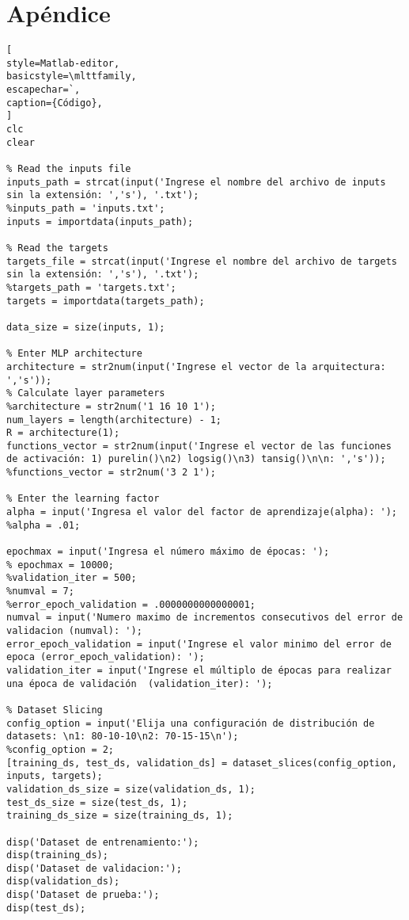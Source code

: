 \documentclass{article}
\begin{document}
\section{Apéndice}
\begin{lstlisting}[
style=Matlab-editor,
basicstyle=\mlttfamily,
escapechar=`,
caption={Código},
]
clc
clear

% Read the inputs file
inputs_path = strcat(input('Ingrese el nombre del archivo de inputs sin la extensión: ','s'), '.txt');
%inputs_path = 'inputs.txt';
inputs = importdata(inputs_path);

% Read the targets
targets_file = strcat(input('Ingrese el nombre del archivo de targets sin la extensión: ','s'), '.txt');
%targets_path = 'targets.txt';
targets = importdata(targets_path);

data_size = size(inputs, 1);

% Enter MLP architecture
architecture = str2num(input('Ingrese el vector de la arquitectura: ','s'));
% Calculate layer parameters
%architecture = str2num('1 16 10 1');
num_layers = length(architecture) - 1;
R = architecture(1);
functions_vector = str2num(input('Ingrese el vector de las funciones de activación: 1) purelin()\n2) logsig()\n3) tansig()\n\n: ','s'));
%functions_vector = str2num('3 2 1');

% Enter the learning factor
alpha = input('Ingresa el valor del factor de aprendizaje(alpha): ');
%alpha = .01;

epochmax = input('Ingresa el número máximo de épocas: ');
% epochmax = 10000;
%validation_iter = 500;
%numval = 7;
%error_epoch_validation = .0000000000000001;
numval = input('Numero maximo de incrementos consecutivos del error de validacion (numval): ');
error_epoch_validation = input('Ingrese el valor minimo del error de epoca (error_epoch_validation): ');
validation_iter = input('Ingrese el múltiplo de épocas para realizar una época de validación  (validation_iter): ');

% Dataset Slicing
config_option = input('Elija una configuración de distribución de datasets: \n1: 80-10-10\n2: 70-15-15\n');
%config_option = 2;
[training_ds, test_ds, validation_ds] = dataset_slices(config_option, inputs, targets);
validation_ds_size = size(validation_ds, 1);
test_ds_size = size(test_ds, 1);
training_ds_size = size(training_ds, 1);

disp('Dataset de entrenamiento:');
disp(training_ds);
disp('Dataset de validacion:');
disp(validation_ds);
disp('Dataset de prueba:');
disp(test_ds);


\end{lstlisting}
\end{document}
